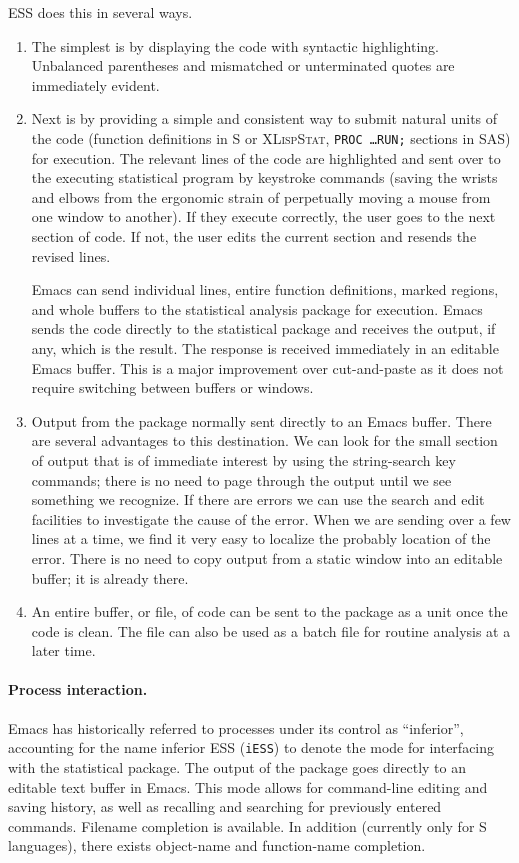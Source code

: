 \documentclass{article}
\newcommand*{\SAS}{\textsc{SAS}}
\newcommand*{\XLispStat}{\textsc{XLispStat}}
\newcommand{\stexttt}[1]{{\small\texttt{#1}}}
\begin{document}
ESS does this in several ways.
\begin{enumerate}
\item The simplest is by displaying the code with syntactic highlighting.
Unbalanced parentheses and mismatched or unterminated quotes are immediately
evident.

\item Next is by providing a simple and consistent way to submit
natural units of the code (function definitions in S or \XLispStat,
\stexttt{PROC \dots RUN;} sections in \SAS) for execution.
The relevant lines of the code are highlighted and sent over to the
executing statistical program by keystroke commands (saving the wrists
and elbows from the ergonomic strain of perpetually moving a mouse from
one window to another).  If they execute correctly, the user goes to the
next section of code.  If not, the user edits the current section and resends
the revised lines.

Emacs can send individual lines, entire function definitions, marked
regions, and whole buffers to the statistical analysis package for
execution.  Emacs sends the code directly to
the statistical package and receives the output, if any, which is
the result.  The response is received immediately in an editable Emacs buffer.
This is a major improvement over cut-and-paste as it does
not require switching between buffers or windows.

\item
Output from the package normally sent directly to an Emacs buffer.
There are several advantages to this destination.  We can look for the
small section of output that is of immediate interest by using the
string-search key commands; there is no need to page through the
output until we see something we recognize.  If there are errors we
can use the search and edit facilities to investigate the cause of the
error.  When we are sending over a few lines at a time, we find
it very easy to localize the probably location of the error.
There is no need to copy output from a static window into an
editable buffer; it is already there.

\item
An entire buffer, or file, of code can be sent to the package as a unit
once the code is clean.  The file can also be used as a batch file for
routine analysis at a later time.

\end{enumerate}


\paragraph{Process interaction.}
Emacs has historically referred to processes under its control as
``inferior'', accounting for the name inferior ESS (\stexttt{iESS}) to
denote the mode for interfacing with the statistical package.  The
output of the package goes directly to an editable text buffer in Emacs.
This mode allows for command-line editing and saving history, as well as
recalling and searching for previously entered commands.  Filename
completion is available.  In addition (currently only for S languages),
there exists object-name and function-name completion.
\end{document}
